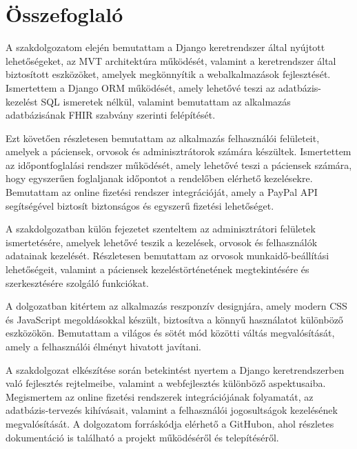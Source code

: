 \chapter{Összefoglaló}
\label{chap:conclusion}

A szakdolgozatom elején bemutattam a Django keretrendszer által nyújtott lehetőségeket, az MVT architektúra működését, valamint a keretrendszer által biztosított eszközöket, amelyek megkönnyítik a webalkalmazások fejlesztését. Ismertettem a Django ORM működését, amely lehetővé teszi az adatbázis-kezelést SQL ismeretek nélkül, valamint bemutattam az alkalmazás adatbázisának FHIR szabvány szerinti felépítését.

Ezt követően részletesen bemutattam az alkalmazás felhasználói felületeit, amelyek a páciensek, orvosok és adminisztrátorok számára készültek. Ismertettem az időpontfoglalási rendszer működését, amely lehetővé teszi a páciensek számára, hogy egyszerűen foglaljanak időpontot a rendelőben elérhető kezelésekre. Bemutattam az online fizetési rendszer integrációját, amely a PayPal API segítségével biztosít biztonságos és egyszerű fizetési lehetőséget.

A szakdolgozatban külön fejezetet szenteltem az adminisztrátori felületek ismertetésére, amelyek lehetővé teszik a kezelések, orvosok és felhasználók adatainak kezelését. Részletesen bemutattam az orvosok munkaidő-beállítási lehetőségeit, valamint a páciensek kezeléstörténetének megtekintésére és szerkesztésére szolgáló funkciókat.

A dolgozatban kitértem az alkalmazás reszponzív designjára, amely modern CSS és JavaScript megoldásokkal készült, biztosítva a könnyű használatot különböző eszközökön. Bemutattam a világos és sötét mód közötti váltás megvalósítását, amely a felhasználói élményt hivatott javítani.

A szakdolgozat elkészítése során betekintést nyertem a Django keretrendszerben való fejlesztés rejtelmeibe, valamint a webfejlesztés különböző aspektusaiba. Megismertem az online fizetési rendszerek integrációjának folyamatát, az adatbázis-tervezés kihívásait, valamint a felhasználói jogosultságok kezelésének megvalósítását. A dolgozatom forráskódja elérhető a GitHubon, ahol részletes dokumentáció is található a projekt működéséről és telepítéséről.
